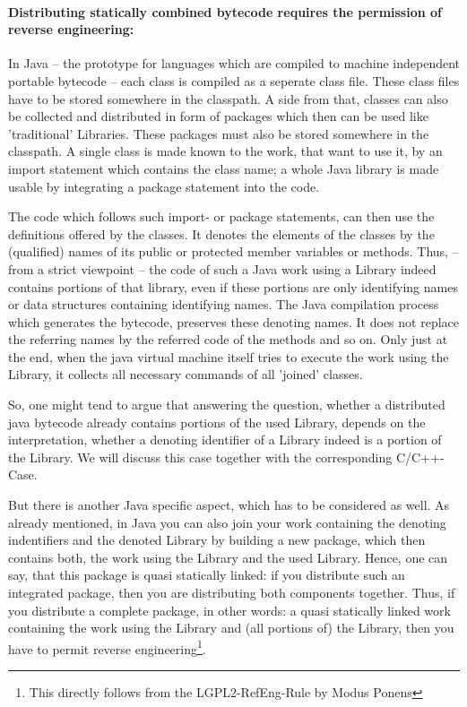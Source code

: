 \paragraph{Distributing statically combined bytecode requires the
permission of reverse engineering:}
\label{RevEngDistributeStaticallyCombinedByteCode}
In Java -- the prototype for languages which are compiled to machine independent
portable bytecode -- each class is compiled as a seperate class file. These
class files have to be stored somewhere in the classpath. A side from that,
classes can also be collected and distributed in form of packages which then can
be used like 'traditional' Libraries. These packages must also be stored
somewhere in the classpath. A single class is made known to the work, that want
to use it, by an import statement which contains the class name; a whole Java
library is made usable by integrating a package statement into the code.

The code which follows such import- or package statements, can then use the
definitions offered by the classes. It denotes the elements of the classes by
the (qualified) names of its public or protected member variables or methods.
Thus, -- from a strict viewpoint -- the code of such a Java work using a Library
indeed contains portions of that library, even if these portions are only
identifying names or data structures containing identifying names. The Java
compilation process which generates the bytecode, preserves these denoting
names. It does not replace the referring names by the referred code of the
methods and so on. Only just at the end, when the java virtual machine itself
tries to execute the work using the Library, it collects all necessary commands
of all 'joined' classes.

So, one might tend to argue that answering the question, whether a distributed
java bytecode already contains portions of the used Library, depends on the
interpretation, whether a denoting identifier of a Library indeed is a portion
of the Library. We will discuss this case together with the corresponding
C/C++-Case. 

But there is another Java specific aspect, which has to be considered as well.
As already mentioned, in Java you can also join your work containing the
denoting indentifiers and the denoted Library by building a new package, which
then contains both, the work using the Library and the used Library. Hence, one
can say, that this package is quasi statically linked: if you distribute such an
integrated package, then you are distributing both components together. Thus, if
you distribute a complete package, in other words: a quasi statically linked
work containing the work using the Library and (all portions of) the Library,
then you have to permit reverse engineering\footnote{This directly follows from
the LGPL2-RefEng-Rule by Modus Ponens}.

